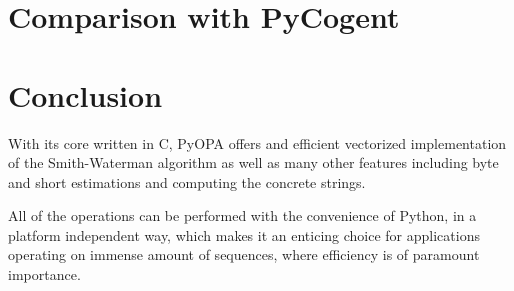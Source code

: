 \documentclass[12pt]{article}
\newcommand{\pp}{PyOPA}
\begin{document}
\section{Comparison with PyCogent}
\label{sec:compCogent}

\section{Conclusion}
\label{sec:concl}

With its core written in C, \pp{} offers and efficient vectorized implementation of the Smith-Waterman algorithm as well as many other features including byte and short estimations and computing the concrete strings.

All of the operations can be performed with the convenience of Python, in a platform independent way, which makes it an enticing choice for applications operating on immense amount of sequences, where efficiency is of paramount importance.
\end{document}
